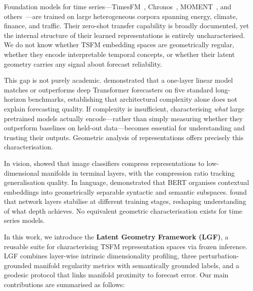 \documentclass[letterpaper,twocolumn]{article}
\begin{document}
Foundation models for time series---TimesFM~\cite{das2024timesfm},
Chronos~\cite{ansari2024chronos}, MOMENT~\cite{goswami2024moment}, and
others~\cite{woo2024moirai,rasul2024lagllama}---are trained on large
heterogeneous corpora spanning energy, climate, finance, and traffic.
Their zero-shot transfer capability is broadly documented, yet the internal
structure of their learned representations is entirely uncharacterised.
We do not know whether TSFM embedding spaces are geometrically regular, whether
they encode interpretable temporal concepts, or whether their latent geometry
carries any signal about forecast reliability.

This gap is not purely academic.
\citet{zeng2023transformers} demonstrated that a one-layer linear model matches or
outperforms deep Transformer forecasters on five standard long-horizon benchmarks,
establishing that architectural complexity alone does not explain forecasting quality.
If complexity is insufficient, characterising \emph{what} large pretrained models
actually encode---rather than simply measuring whether they outperform baselines on
held-out data---becomes essential for understanding and trusting their outputs.
Geometric analysis of representations offers precisely this characterisation.

In vision, \citet{ansuini2019intrinsic} showed that image classifiers compress
representations to low-dimensional manifolds in terminal layers, with the compression
ratio tracking generalisation quality.
In language, \citet{reif2019visualizing} demonstrated that BERT organises
contextual embeddings into geometrically separable syntactic and semantic subspaces.
\citet{raghu2017svcca} found that network layers stabilise at different training
stages, reshaping understanding of what depth achieves.
No equivalent geometric characterisation exists for time series models.

In this work, we introduce the \textbf{Latent Geometry Framework (LGF)}, a
reusable suite for characterising TSFM representation spaces via frozen inference.
LGF combines layer-wise intrinsic dimensionality profiling, three
perturbation-grounded manifold regularity metrics with semantically grounded labels,
and a geodesic protocol that links manifold proximity to forecast error.
Our main contributions are summarised as follows:
\end{document}

